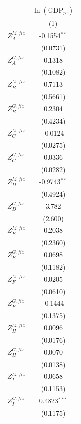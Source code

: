 \begingroup
\centering
\begin{tabular}{lc}
   \toprule
                   & $\ln(\text{GDP}_{pc})$\\    
                   & (1)\\  
   \midrule 
   $Z^{M,fix}_A$   & -0.1554$^{**}$\\   
                   & (0.0731)\\   
   $Z^{G,fix}_A$   & 0.1318\\   
                   & (0.1082)\\   
   $Z^{M,fix}_B$   & 0.7113\\   
                   & (0.5661)\\   
   $Z^{G,fix}_B$   & 0.2304\\   
                   & (0.4234)\\   
   $Z^{M,fix}_C$   & -0.0124\\   
                   & (0.0275)\\   
   $Z^{G,fix}_C$   & 0.0336\\   
                   & (0.0282)\\   
   $Z^{M,fix}_D$   & -0.9743$^{**}$\\   
                   & (0.4924)\\   
   $Z^{G,fix}_D$   & 3.782\\   
                   & (2.600)\\   
   $Z^{M,fix}_E$   & 0.2038\\   
                   & (0.2360)\\   
   $Z^{G,fix}_E$   & 0.0698\\   
                   & (0.1182)\\   
   $Z^{M,fix}_F$   & 0.0205\\   
                   & (0.0610)\\   
   $Z^{G,fix}_F$   & -0.1444\\   
                   & (0.1375)\\   
   $Z^{M,fix}_H$   & 0.0096\\   
                   & (0.0176)\\   
   $Z^{G,fix}_H$   & 0.0070\\   
                   & (0.0138)\\   
   $Z^{M,fix}_I$   & 0.0658\\   
                   & (0.1153)\\   
   $Z^{G,fix}_I$   & 0.4823$^{***}$\\   
                   & (0.1175)\\   

\end{tabular}
